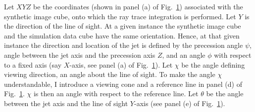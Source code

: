 \begin{appendices}
\begin{figure}
\label{f:rot}
\end{figure}

Let $XYZ$ be the coordinates (shown in panel (a) of Fig.~\ref{f:rot}) associated with the synthetic image cube, onto which the ray trace integration is performed. Let $Y$ is the direction of the line of sight. At a given instance the synthetic image cube and the simulation data cube have the same orientation. Hence, at that given instance the direction and location of the jet is defined by the precession angle $\psi$, angle between the jet axis and the precession axis $Z$, and an angle $\phi$ with respect to a fixed axis (say $X$-axis, see panel (a) of Fig.~\ref{f:rot}). Let $\chi$ be the angle defining viewing direction, an angle about the line of sight. To make the angle $
\chi$ understandable, I introduce a viewing cone and a reference line in panel (d) of Fig.~\ref{f:rot}. $\chi$ is then an angle with respect to the reference line. Let $\theta$ be the angle between the jet axis and the line of sight $Y$-axis (see panel (e) of Fig.~\ref{f:rot}).


\end{appendices}
